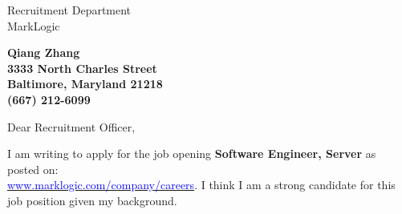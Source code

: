 \documentclass[11pt]{letter} %
\begin{document}

\begin{letter}{Recruitment Department \\
MarkLogic} 


\begin{center}
\large\bf Qiang Zhang \\ %
3333 North Charles Street \\ Baltimore, Maryland 21218 \\ (667) 212-6099 %
\end{center} 
\vfill

\signature{Qiang Zhang} %


\opening{Dear Recruitment Officer,} 
 

I am writing to apply for the job opening \textbf{Software Engineer, Server} as posted on:\\
\href{https://www.marklogic.com/company/careers/open-positions/#details/oLIN4fw4}{\textcolor{blue}{www.marklogic.com/company/careers}}. I think I am a strong candidate for this job position given my background.



\end{letter}
\end{document}
